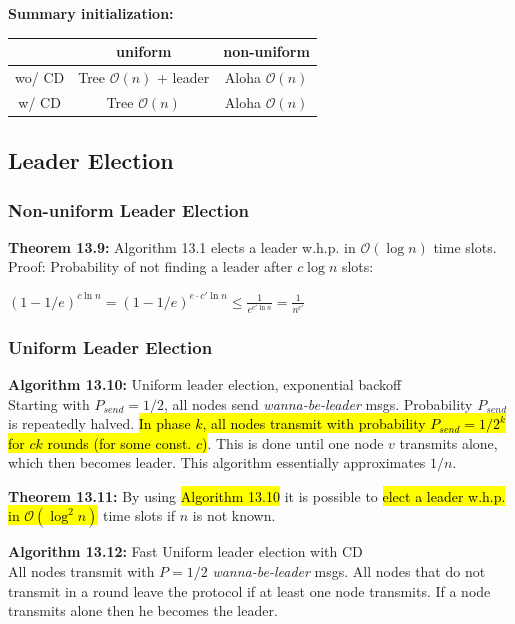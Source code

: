 \documentclass[a4paper, 8pt, landscape]{scrartcl}
\begin{document}
\begin{multicols*}{3}
\textbf{Summary initialization:}
\vspace*{-2mm}
\begin{center}
\begin{tabular}{@{}ccc@{}}
	\hline 
	& uniform & non-uniform \\ 
	\hline 
	wo/ CD & Tree $\mathcal{O}(n)$ + leader & Aloha $\mathcal{O}(n)$ \\ 
	w/ CD & Tree $\mathcal{O}(n)$ & Aloha $\mathcal{O}(n)$ \\ 
	\hline 
\end{tabular} 
\end{center}

\subsection{Leader Election}

\subsubsection{Non-uniform Leader Election}

\textbf{Theorem 13.9:} Algorithm 13.1 elects a leader w.h.p. in $\mathcal{O}(\log n)$ time slots.\\
Proof: Probability of not finding a leader after $c\log n$ slots:

$(1 - 1/e)^{c\ln n} = (1 - 1/e)^{e\cdot c'\ln n} \leq \frac{1}{e^{c'\ln n}} = \frac{1}{n^{c'}}$

\subsubsection{Uniform Leader Election}

\textbf{Algorithm 13.10:} Uniform leader election, exponential backoff\\
Starting with $P_{send} = 1/2$, all nodes send \textit{wanna-be-leader} msgs. Probability $P_{send}$ is repeatedly halved. \hl{In phase $k$, all nodes transmit with probability $P_{send} = 1/2^k$ for $ck$ rounds (for some const. $c$)}. This is done until one node $v$ transmits alone, which then becomes leader. This algorithm essentially approximates $1/n$.

\textbf{Theorem 13.11:} By using \hl{Algorithm 13.10} it is possible to \hl{elect a leader w.h.p. in $\mathcal{O}(\log^2 n)$} time slots if $n$ is not known.


\textbf{Algorithm 13.12:} Fast Uniform leader election with CD\\
All nodes transmit with $P = 1/2$ \textit{wanna-be-leader} msgs. All nodes that do not transmit in a round leave the protocol if at least one node transmits. If a node transmits alone then he becomes the leader.


\end{multicols*}
\end{document}
